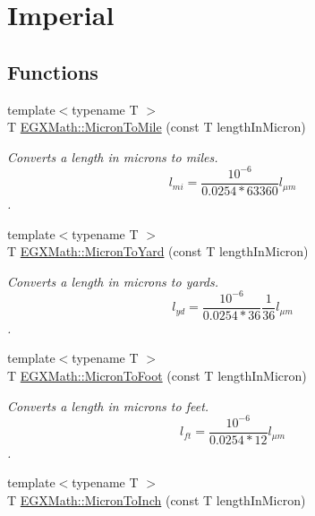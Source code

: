 \hypertarget{group___e_g_x_math-_conversions-_length_conversions-_non-_s_i-_micron-_imperial}{}\section{Imperial}
\label{group___e_g_x_math-_conversions-_length_conversions-_non-_s_i-_micron-_imperial}
\subsection*{Functions}
\begin{DoxyCompactItemize}
\item 
{\footnotesize template$<$typename T $>$ }\\T \mbox{\hyperlink{group___e_g_x_math-_conversions-_length_conversions-_non-_s_i-_micron-_imperial_ga4a6e2d3df67af4008be36f3899c1ca19}{E\+G\+X\+Math\+::\+Micron\+To\+Mile}} (const T length\+In\+Micron)
\begin{DoxyCompactList}\small\item\em Converts a length in microns to miles. \[ l_{mi}=\frac{10^{-6}}{0.0254 * 63360} l_{\mu m} \]. \end{DoxyCompactList}\item 
{\footnotesize template$<$typename T $>$ }\\T \mbox{\hyperlink{group___e_g_x_math-_conversions-_length_conversions-_non-_s_i-_micron-_imperial_gae986c2e4dc5b38e249a8ec2fa2a3a0ea}{E\+G\+X\+Math\+::\+Micron\+To\+Yard}} (const T length\+In\+Micron)
\begin{DoxyCompactList}\small\item\em Converts a length in microns to yards. \[ l_{yd}= \frac{10^{-6}}{0.0254 * 36} \frac{1}{36} l_{\mu m} \]. \end{DoxyCompactList}\item 
{\footnotesize template$<$typename T $>$ }\\T \mbox{\hyperlink{group___e_g_x_math-_conversions-_length_conversions-_non-_s_i-_micron-_imperial_gab90a87773543173f5b774b6ccb646b5f}{E\+G\+X\+Math\+::\+Micron\+To\+Foot}} (const T length\+In\+Micron)
\begin{DoxyCompactList}\small\item\em Converts a length in microns to feet. \[ l_{ft}= \frac{10^{-6}}{0.0254 * 12} l_{\mu m} \]. \end{DoxyCompactList}\item 
{\footnotesize template$<$typename T $>$ }\\T \mbox{\hyperlink{group___e_g_x_math-_conversions-_length_conversions-_non-_s_i-_micron-_imperial_ga12a0ceda3109e1f972dd62a797c78503}{E\+G\+X\+Math\+::\+Micron\+To\+Inch}} (const T length\+In\+Micron)

\end{DoxyCompactItemize}
